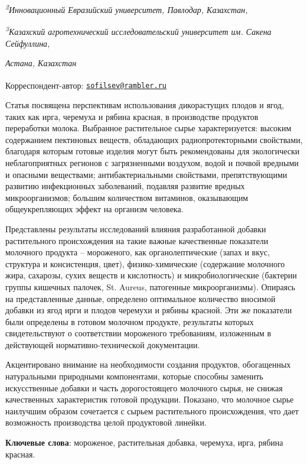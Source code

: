 {{\emph{\textsuperscript{2}Инновационный Евразийский университет,
Павлодар, Казахстан,}

\emph{\textsuperscript{3}Казахский агротехнический исследовательский
университет им. Сакена Сейфуллина,}

\emph{Астана, Казахстан}

{\bfseries \textsuperscript{\envelope }}Корреспондент-автор:
\href{mailto:sofilsev@rambler.ru}{\nolinkurl{sofilsev@rambler.ru}}

Статья посвящена перспективам использования дикорастущих плодов и ягод,
таких как ирга, черемуха и рябина красная, в производстве продуктов
переработки молока. Выбранное растительное сырье характеризуется:
высоким содержанием пектиновых веществ, обладающих радиопротекторными
свойствами, благодаря которым готовые изделия могут быть рекомендованы
для экологически неблагоприятных регионов с загрязненными воздухом,
водой и почвой вредными и опасными веществами; антибактериальными
свойствами, препятствующими развитию инфекционных заболеваний, подавляя
развитие вредных микроорганизмов; большим количеством витаминов,
оказывающим общеукрепляющих эффект на организм человека.

Представлены результаты исследований влияния разработанной добавки
растительного происхождения на такие важные качественные показатели
молочного продукта -- мороженого, как органолептические (запах и вкус,
структура и консистенция, цвет), физико-химические (содержание молочного
жира, сахарозы, сухих веществ и кислотность) и микробиологические
(бактерии группы кишечных палочек, St. Aureus, патогенные
микроорганизмы). Опираясь на представленные данные, определено
оптимальное количество вносимой добавки из ягод ирги и плодов черемухи и
рябины красной. Эти же показатели были определены в готовом молочном
продукте, результаты которых свидетельствуют о соответствии мороженого
требованиям, изложенным в действующей нормативно-технической
документации.

Акцентировано внимание на необходимости создания продуктов, обогащенных
натуральными природными компонентами, которые способны заменить
искусственные добавки и часть дорогостоящего молочного сырья, не снижая
качественных характеристик готовой продукции. Показано, что молочное
сырье наилучшим образом сочетается с сырьем растительного происхождения,
что дает возможность производства целой продуктовой линейки.

{\bfseries Ключевые слова}: мороженое, растительная добавка, черемуха,
ирга, рябина красная.

}}
